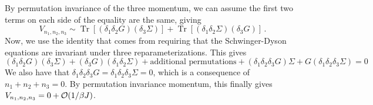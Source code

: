 \documentclass[aps,prx,preprint,onecolumn,citeautoscript,footinbib]{revtex4-1}
\newcommand{\Tr}{\operatorname{Tr}}
\begin{document}
By permutation invariance of the three momentum, we can assume the first two terms on each side of the equality are the same, giving
\begin{equation}
    V_{n_1, n_2, n_3} \sim \Tr[(\delta_1 \delta_2 G) (\delta_3 \Sigma)] + \Tr[(\delta_1 \delta_2 \Sigma) (\delta_3 G)]\,.
    \label{eq:planarReduced}
\end{equation}
Now, we use the identity that comes from requiring that the Schwinger-Dyson equations are invariant under three reparameterizations. This gives
\begin{equation}
   (\delta_1 \delta_2 G)(\delta_3 \Sigma) + (\delta_3 G)(\delta_1 \delta_2 \Sigma) + \text{additional permutations} + (\delta_1 \delta_2 \delta_3 G)\Sigma + G (\delta_1 \delta_2 \delta_3 \Sigma) = 0
   \label{eq:reparamIdentiy}
\end{equation}
We also have that $\delta_1 \delta_2 \delta_3 G = \delta_1 \delta_2 \delta_3 \Sigma = 0$, which is a consequence of $n_1 + n_2 + n_3 = 0$. By permutation invariance momentum, this finally gives $V_{n_1, n_2, n_3} = 0 + \order{1/\beta J}$. 
\end{document}
